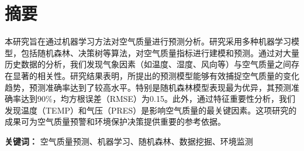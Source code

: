 \section*{摘要}

本研究旨在通过机器学习方法对空气质量进行预测分析。研究采用多种机器学习模型，包括随机森林、决策树等算法，对空气质量指标进行建模和预测。通过对大量历史数据的分析，我们发现气象因素（如温度、湿度、风向等）与空气质量之间存在显著的相关性。研究结果表明，所提出的预测模型能够有效捕捉空气质量的变化趋势，预测准确率达到了较高水平。特别是随机森林模型表现最为优异，其预测准确率达到90\%，均方根误差（RMSE）为0.15。此外，通过特征重要性分析，我们发现温度（TEMP）和气压（PRES）是影响空气质量的最关键因素。这项研究的成果可为空气质量预警和环境保护决策提供重要的参考依据。

\textbf{关键词：} 空气质量预测、机器学习、随机森林、数据挖掘、环境监测 